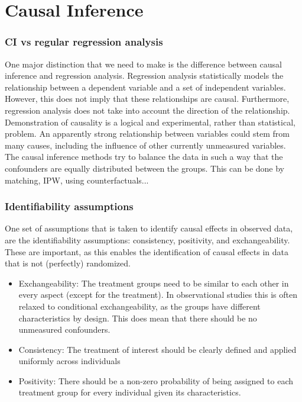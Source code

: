 \section{Causal Inference}
\subsubsection{CI vs regular regression analysis}

One major distinction that we need to make is the difference between causal inference and regression analysis.
Regression analysis statistically models the relationship between a dependent variable and a set of independent variables. 
However, this does not imply that these relationships are causal.
Furthermore, regression analysis does not take into account the direction of the relationship.
Demonstration of causality is a logical and experimental, rather than statistical, problem. 
An apparently strong relationship between variables could stem from many causes, including the influence of other currently unmeasured variables.
The causal inference methods try to balance the data in such a way that the confounders are equally distributed between the groups.
This can be done by matching, IPW, using counterfactuals...

\subsubsection{Identifiability assumptions}

One set of assumptions that is taken to identify causal effects in observed data, are the identifiability assumptions: consistency, positivity, and exchangeability.
These are important, as this enables the identification of causal effects in data that is not (perfectly) randomized. 

\begin{itemize}
    \item Exchangeability: The treatment groups need to be similar to each other in every aspect (except for the treatment). 
    In observational studies this is often relaxed to conditional exchangeability, as the groups have different characteristics by design. 
    This does mean that there should be no unmeasured confounders.
    \item Consistency: The treatment of interest should be clearly defined and applied uniformly across individuals
    \item Positivity: There should be a non-zero probability of being assigned to each treatment group for every individual given its characteristics.
\end{itemize}

